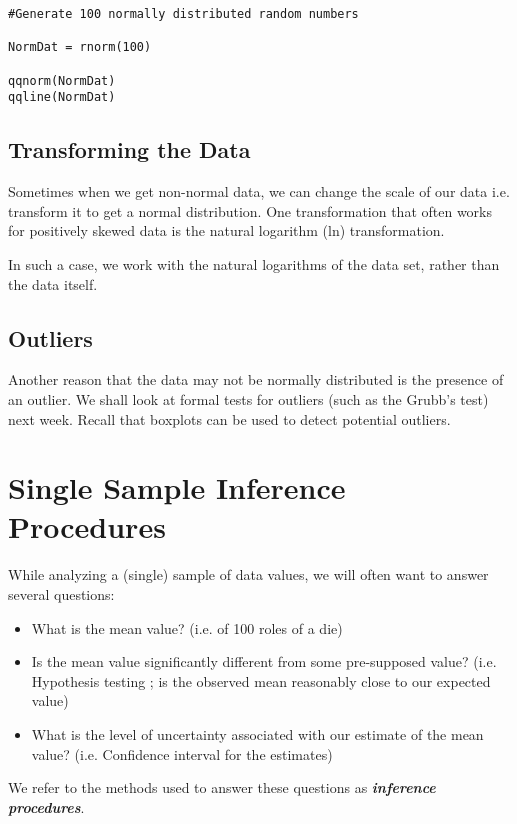 \documentclass[a4paper,12pt]{article}
\begin{document}
\begin{framed}
\begin{verbatim}
#Generate 100 normally distributed random numbers

NormDat = rnorm(100)

qqnorm(NormDat)
qqline(NormDat)
\end{verbatim}
\end{framed}

\subsection{Transforming the Data}

Sometimes when we get non-normal data, we can change the scale of our data i.e. transform it to get a normal distribution. One transformation that often works for positively skewed data is the natural logarithm (ln) transformation.

In such a case, we work with the natural logarithms of the data set, rather than the data itself.
\subsection{Outliers}
Another reason that the data may not be normally distributed is the presence of an outlier. We shall look at formal tests for outliers (such as the Grubb's test) next week. Recall that boxplots can be used to detect potential outliers.

\section{Single Sample Inference Procedures}

While analyzing a (single) sample of data values, we will often want to answer several questions:
\begin{itemize}
\item	What is the mean value?  (i.e. of 100 roles of a die)
\item	Is the mean value significantly different from some pre-supposed value?
(i.e. Hypothesis testing ; is the observed mean reasonably close to our expected value)
\item	What is the level of uncertainty associated with our estimate of the mean value? (i.e. Confidence interval for the estimates)
\end{itemize}
We refer to the methods used to answer these questions as \textbf{\emph{inference procedures}}.
\end{document}
